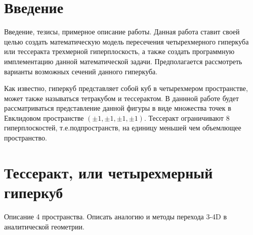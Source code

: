 \documentclass[12pt, a4paper, twoside]{report}
\begin{document}

\tableofcontents

\newpage
\section{Введение}
Введение, тезисы, примерное описание работы.
Данная работа ставит своей целью создать математическую модель пересечения четырехмерного гиперкуба или тессеракта трехмерной гиперплоскость, а также создать программную имплементацию данной математической задачи. Предполагается рассмотреть варианты возможных сечений данного гиперкуба.

Как известно, гиперкуб представляет собой куб в четырехмером пространстве, может также называться тетракубом и тессерактом. В даннной работе будет рассматриваться представление данной фигуры в виде множества точек в Евклидовом пространстве $(\pm 1,\pm 1,\pm 1, \pm 1)$. Тессеракт ограничивают 8 гиперплоскостей, т.е.подпространств, на единицу меньшей чем объемлющее пространство.


\section{Тессеракт, или четырехмерный гиперкуб}
\begin{figure}[h!]
	\center
	\clearpage
\end{figure}
Описание 4 пространства. Описать аналогию и методы перехода 3-4D в аналитической геометрии.
\end{document}
